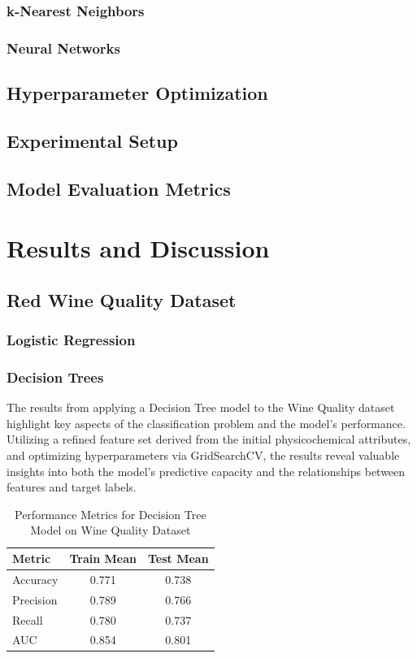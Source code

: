 \documentclass[conference]{IEEEtran}
\begin{document}
\subsubsection{k-Nearest Neighbors}
\subsubsection{Neural Networks}

\subsection{Hyperparameter Optimization}

\subsection{Experimental Setup}
\subsection{Model Evaluation Metrics}


\section{Results and Discussion}
\subsection{Red Wine Quality Dataset}
\subsubsection{Logistic Regression}
\subsubsection{Decision Trees}
The results from applying a Decision Tree model to the Wine Quality dataset highlight key aspects of the classification problem and the model's performance. Utilizing a refined feature set derived from the initial physicochemical attributes, and optimizing hyperparameters via GridSearchCV, the results reveal valuable insights into both the model's predictive capacity and the relationships between features and target labels.

\begin{table}[h]
  \centering
  \caption{Performance Metrics for Decision Tree Model on Wine Quality Dataset}
  \label{tab:dt_wine}
  \begin{tabular}{|l|c|c|}
  \hline
  \textbf{Metric}         & \textbf{Train Mean} & \textbf{Test Mean} \\ \hline
  Accuracy                & 0.771               & 0.738              \\ \hline
  Precision               & 0.789               & 0.766              \\ \hline
  Recall                  & 0.780               & 0.737              \\ \hline
  AUC                     & 0.854               & 0.801              \\ \hline
  \end{tabular}
  \end{table}
\end{document}
